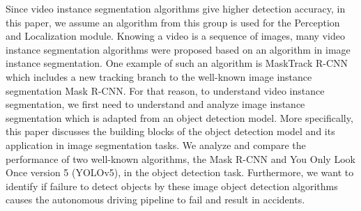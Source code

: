 Since video instance segmentation algorithms give higher detection accuracy, in this paper, we assume an algorithm from this group is used for the Perception and Localization module. Knowing a video is a sequence of images, many video instance segmentation algorithms were proposed based on an algorithm in image instance segmentation. One example of such an algorithm is MaskTrack R-CNN which includes a new tracking branch to the well-known image instance segmentation Mask R-CNN. For that reason, to understand video instance segmentation, we first need to understand and analyze image instance segmentation which is adapted from an object detection model. More specifically, this paper discusses the building blocks of the object detection model and its application in image segmentation tasks. We analyze and compare the performance of two well-known algorithms, the Mask R-CNN and You Only Look Once version 5 (YOLOv5), in the object detection task. Furthermore, we want to identify if failure to detect objects by these image object detection algorithms causes the autonomous driving pipeline to fail and result in accidents.
